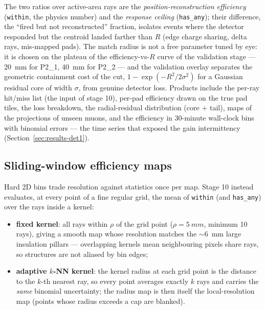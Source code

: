 \documentclass[11pt,a4paper]{article}
\newcommand{\detone}{P2\_1}
\newcommand{\dettwo}{P2\_2}
\newcommand{\code}[1]{\texttt{#1}}
\begin{document}
The two ratios over active-area rays are the \emph{position-reconstruction
efficiency} (\code{within}, the physics number) and the \emph{response
ceiling} (\code{has\_any}); their difference, the ``fired but not
reconstructed'' fraction, isolates events where the detector responded but
the centroid landed farther than $R$ (edge charge sharing, delta rays,
mis-mapped pads). The match radius is not a free parameter tuned by eye: it
is chosen on the plateau of the efficiency-vs-$R$ curve of the validation
stage --- \SI{20}{mm} for \detone{}, \SI{40}{mm} for \dettwo{} --- and the
validation overlay separates the geometric containment cost of the cut,
$1-\exp\left(-R^2/2\sigma^2\right)$ for a Gaussian residual core of width
$\sigma$, from genuine detector loss. Products include the per-ray hit/miss
list (the input of stage 10), per-pad efficiency drawn on the true pad
tiles, the loss breakdown, the radial-residual distribution (core $+$ tail),
maps of the projections of unseen muons, and the efficiency in 30-minute
wall-clock bins with binomial errors --- the time series that exposed the
gain intermittency (Section~\ref{sec:results-det1}).

\subsection{Sliding-window efficiency maps}
\label{sec:sliding}

Hard 2D bins trade resolution against statistics once per map. Stage 10
instead evaluates, at every point of a fine regular grid, the mean of
\code{within} (and \code{has\_any}) over the rays inside a kernel:

\begin{itemize}[itemsep=2pt]
  \item \textbf{fixed kernel}: all rays within $\rho$ of the grid point
        ($\rho = \SI{5}{mm}$, minimum 10 rays), giving a smooth map whose
        resolution matches the $\sim$\SI{6}{mm} large insulation pillars ---
        overlapping kernels mean neighbouring pixels share rays, so
        structures are not aliased by bin edges;
  \item \textbf{adaptive $k$-NN kernel}: the kernel radius at each grid point
        is the distance to the $k$-th nearest ray, so every point averages
        exactly $k$ rays and carries the \emph{same} binomial uncertainty;
        the radius map is then itself the local-resolution map (points whose
        radius exceeds a cap are blanked).
\end{itemize}
\end{document}
